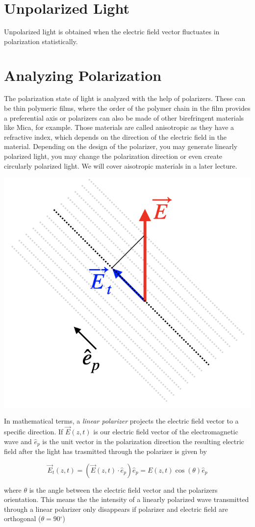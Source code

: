 \documentclass[
  a4paper,
]{book}
\begin{document}
\section{Unpolarized Light}\label{unpolarized-light}

Unpolarized light is obtained when the electric field vector fluctuates
in polarization statistically.

\section{Analyzing Polarization}\label{analyzing-polarization}

The polarization state of light is analyzed with the help of polarizers.
These can be thin polymeric films, where the order of the polymer chain
in the film provides a preferential axis or polarizers can also be made
of other birefringent materials like Mica, for example. Those materials
are called anisotropic as they have a refractive index, which depends on
the direction of the electric field in the material. Depending on the
design of the polarizer, you may generate linearly polarized light, you
may change the polarization direction or even create circularly
polarized light. We will cover aisotropic materials in a later lecture.

\includegraphics[width=0.4\linewidth,height=\textheight,keepaspectratio]{electromagnetic-waves/img/lin_pol.png}

In mathematical terms, a \emph{linear polarizer} projects the electric
field vector to a specific direction. If \(\vec{E}(z,t)\) is our
electric field vector of the electromagnetic wave and \(\hat{e}_{p}\) is
the unit vector in the polarization direction the resulting electric
field after the light has trasmitted through the polarizer is given by

\[
\vec{E}_t(z,t)=(\vec{E}(z,t)\cdot \hat{e}_p)\hat{e}_p=E(z,t)\cos(\theta)\hat{e}_p
\]

where \(\theta\) is the angle between the electric field vector and the
polarizers orientation. This means the the intensity of a linearly
polarized wave transmitted through a linear polarizer only disappears if
polarizer and electric field are orthogonal (\(\theta=90{^\circ}\))
\end{document}
